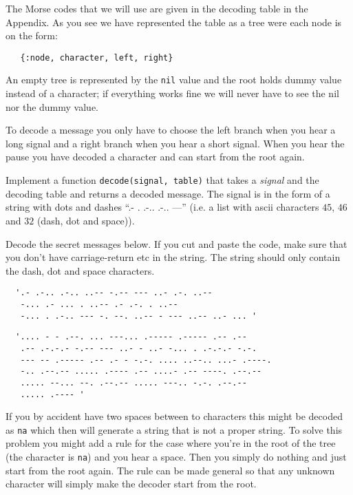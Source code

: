 \documentclass[a4paper,11pt]{article}
\begin{document}
The Morse codes that we will use are given in the decoding table in
the Appendix. As you see we have represented the table as a tree were
each node is on the form:

\begin{verbatim}
   {:node, character, left, right}
\end{verbatim}

An empty tree is represented by the {\tt nil} value and the root holds
dummy value instead of a character; if everything works fine we
will never have to see the nil nor the dummy value.

To decode a message you only have to choose the left branch when you
hear a long signal and a right branch when you hear a short
signal. When you hear the pause you have decoded a character and can
start from the root again. 

Implement a function {\tt decode(signal, table)} that takes a {\em
  signal} and the decoding table and returns a decoded message. The
signal is in the form of a string with dots and dashes ``.-
. .-.. .-.. ---'' (i.e. a list with ascii characters $45$, $46$ and
$32$ (dash, dot and space)).

Decode the secret messages below. If you cut and paste the code, make
sure that you don't have carriage-return etc in the string. The string
should only contain the dash, dot and space characters. 

\begin{verbatim}
  '.- .-.. .-.. ..-- -.-- --- ..- .-. ..-- 
   -... .- ... . ..-- .- .-. . ..-- 
   -... . .-.. --- -. --. ..-- - --- ..-- ..- ... '
\end{verbatim}

\begin{verbatim}
  '.... - - .--. ... ---... .----- .----- .-- .-- 
   .-- .-.-.- -.-- --- ..- - ..- -... . .-.-.- -.-. 
   --- -- .----- .-- .- - -.-. .... ..--.. ...- .----. 
   -.. .--.-- ..... .---- .-- ....- .-- ----. .--.-- 
   ..... --... --. .--.-- ..... ---.. -.-. .--.-- 
   ..... .---- '
\end{verbatim}

If you by accident have two spaces between to characters this might be
decoded as {\tt na} which then will generate a string that is not a
proper string. To solve this problem you might add a rule for the case
where you're in the root of the tree (the character is {\tt na}) and
you hear a space. Then you simply do nothing and just start from the
root again. The rule can be made general so that any unknown character
will simply make the decoder start from the root.
\end{document}

